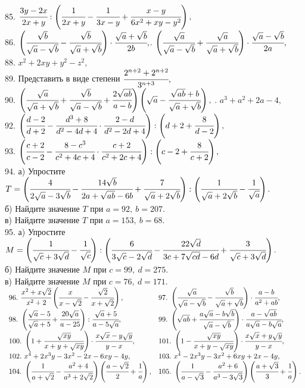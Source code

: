 85. $\cfrac{3y-2x}{2x+y}:\left(\cfrac{1}{2x+y}-\cfrac{1}{3x-y}+\cfrac{x-y}{6x^2+xy-y^2}\right),$\\
86. $\left(\cfrac{\sqrt{b}}{\sqrt{a}-\sqrt{b}}-\cfrac{\sqrt{b}}{\sqrt{a}+\sqrt{b}}\right)\cdot\cfrac{\sqrt{a}+\sqrt{b}}{2b},$\qquad{}. $\left(\cfrac{\sqrt{a}}{\sqrt{a}-\sqrt{b}}+\cfrac{\sqrt{a}}{\sqrt{a}+\sqrt{b}}\right)\cdot\cfrac{\sqrt{a}-\sqrt{b}}{2a},$\\
88. $x^2+2xy+y^2-z^2,$\\
89. Представить в виде степени $\cfrac{2^{n+2}+2^{n+2}}{3^{n+3}},$\\
90. $\left(\cfrac{\sqrt{a}}{\sqrt{a}+\sqrt{b}}+\cfrac{\sqrt{b}}{\sqrt{a}-\sqrt{b}}+\cfrac{2\sqrt{ab}}{a-b}\right)\left(\sqrt{a}-\cfrac{\sqrt{ab}+b}{\sqrt{a}+\sqrt{b}}\right),$
. $a^3+a^2+2a-4,$\\
92. $\left(\cfrac{d-2}{d+2}-\cfrac{d^3+8}{d^2-4d+4}\cdot\cfrac{2-d}{d^2-2d+4}\right):\left(d+2+\cfrac{8}{d-2}\right),$\\
93. $\left(\cfrac{c+2}{c-2}-\cfrac{8-c^3}{c^2+4c+4}\cdot\cfrac{c+2}{c^2+2c+4}\right):\left(c-2+\cfrac{8}{c+2}\right),$\\
94. а) Упростите $T=\left(\cfrac{4}{2\sqrt{a}-3\sqrt{b}}-\cfrac{14\sqrt{b}}{2a+\sqrt{ab}-6b}+\cfrac{7}{\sqrt{a}+2\sqrt{b}}\right):\left(\cfrac{1}{\sqrt{a}+2\sqrt{b}}-\cfrac{1}{\sqrt{a}}\right).$\\
б) Найдите значение $T$ при $a=92,\ b=207.$\\
в) Найдите значение $T$ при $a=153,\ b=68.$\\
95. а) Упростите $M=\left(\cfrac{1}{\sqrt{c}+3\sqrt{d}}-\cfrac{1}{\sqrt{c}}\right):\left(\cfrac{6}{3\sqrt{c}-2\sqrt{d}}-\cfrac{22\sqrt{d}}{3c+7\sqrt{cd}-6d}+\cfrac{3}{\sqrt{c}+3\sqrt{d}}\right).$\\
б) Найдите значение $M$ при $c=99,\ d=275.$\\
в) Найдите значение $M$ при $c=76,\ d=171.$\\
$\begin{array}{ll}
96.\ \cfrac{x^2+x\sqrt{2}}{x^2+2}\left(\cfrac{x}{x-\sqrt{2}}-\cfrac{\sqrt{2}}{x+\sqrt{2}}\right),&
97.\ \left(\cfrac{\sqrt{a}}{\sqrt{a}-\sqrt{b}}-\cfrac{\sqrt{b}}{\sqrt{a}+\sqrt{b}}\right)\cdot\cfrac{a-b}{a^2+ab},\\
98.\ \left(\cfrac{\sqrt{a}-5}{\sqrt{a}+5}+\cfrac{20\sqrt{a}}{a-25}\right):\cfrac{\sqrt{a}+5}{a-5\sqrt{a}},&
99.\ \left(\sqrt{ab}+\cfrac{a\sqrt{a}-b\sqrt{b}}{\sqrt{a}-\sqrt{b}}\right)\cdot\cfrac{a-\sqrt{ab}}{a\sqrt{a}-b\sqrt{a}},\\
100.\ \left(1+\cfrac{\sqrt{xy}}{x+y+\sqrt{xy}}\right)\cdot\cfrac{x\sqrt{x}-y\sqrt{y}}{y-x},&
101.\ \left(1-\cfrac{\sqrt{xy}}{x+y-\sqrt{xy}}\right)\cdot\cfrac{x\sqrt{x}+y\sqrt{y}}{y-x},\\
102.\ x^4+2x^3y-3x^2-2x-6xy-4y,&
103.\ x^4-2x^3y-3x^2+6xy+2x-4y,\\
104.\ \left(\cfrac{1}{a+\sqrt{2}}-\cfrac{a^2+4}{a^3+2\sqrt{2}}\right) \left (\cfrac{a-\sqrt{2}}{2}+\cfrac{1}{a}\right),&
105.\ \left(\cfrac{1}{a-\sqrt{3}}-\cfrac{a^2+6}{a^3-3\sqrt{3}}\right) \left (\cfrac{a+\sqrt{3}}{3}+\cfrac{1}{a}\right).
\end{array}$
\newpage
